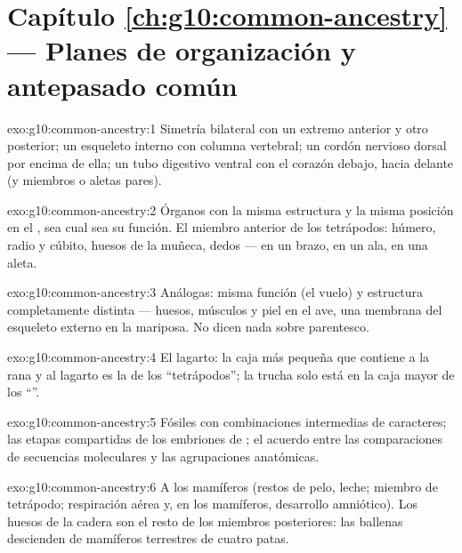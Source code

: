 \section*{Capítulo \ref{ch:g10:common-ancestry} --- Planes de organización y antepasado común}

\begin{solution}{exo:g10:common-ancestry:1}
Simetría bilateral con un extremo anterior y otro posterior; un
esqueleto interno con columna vertebral; un cordón nervioso dorsal por
encima de ella; un tubo digestivo ventral con el corazón debajo, hacia
delante (y miembros o aletas pares).
\end{solution}

\begin{solution}{exo:g10:common-ancestry:2}
Órganos con la misma estructura y la misma posición en el , sea cual sea su función. El miembro anterior de los
tetrápodos: húmero, radio y cúbito, huesos de la muñeca, dedos --- en
un brazo, en un ala, en una aleta.
\end{solution}

\begin{solution}{exo:g10:common-ancestry:3}
Análogas: misma función (el vuelo) y estructura completamente distinta
--- huesos, músculos y piel en el ave, una membrana del esqueleto
externo en la mariposa. No dicen nada sobre parentesco.
\end{solution}

\begin{solution}{exo:g10:common-ancestry:4}
El lagarto: la caja más pequeña que contiene a la rana y al lagarto es
la de los ``tetrápodos''; la trucha solo está en la caja mayor de los
``''.
\end{solution}

\begin{solution}{exo:g10:common-ancestry:5}
Fósiles con combinaciones intermedias de caracteres; las etapas
compartidas de los embriones de ; el acuerdo entre las
comparaciones de secuencias moleculares y las agrupaciones anatómicas.
\end{solution}

\begin{solution}{exo:g10:common-ancestry:6}
A los mamíferos (restos de pelo, leche; miembro de tetrápodo;
respiración aérea y, en los mamíferos, desarrollo amniótico). Los
huesos de la cadera son el resto de los miembros posteriores: las
ballenas descienden de mamíferos terrestres de cuatro patas.
\end{solution}


